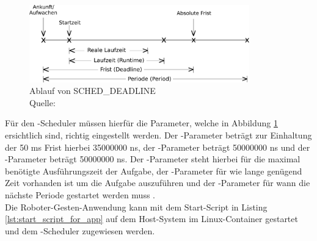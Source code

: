 \begin{figure}[htb]
	\centering
	\includegraphics[width=0.85\textwidth]{images/anhang/sched_deadline}
	\caption[Ablauf von SCHED\_DEADLINE]{Ablauf von SCHED\_DEADLINE \\Quelle: \cite{man_sched7_nodate}}
	\label{fig:sched_deadline}
\end{figure}
\FloatBarrier

Für den -Scheduler müssen hierfür die Parameter, welche in Abbildung \ref{fig:sched_deadline} ersichtlich sind, richtig eingestellt werden. Der -Parameter beträgt zur Einhaltung der 50 ms Frist hierbei 35000000 ns, der -Parameter beträgt 50000000 ns und der -Parameter beträgt 50000000 ns. Der -Parameter steht hierbei für die maximal benötigte Ausführungszeit der Aufgabe, der -Parameter für wie lange genügend Zeit vorhanden ist um die Aufgabe auszuführen und der -Parameter für wann die nächste Periode gestartet werden muss \cite{man_sched7_nodate}.\\

Die Roboter-Gesten-Anwendung kann mit dem Start-Script in Listing \ref{lst:start_script_for_app} auf dem Host-System im Linux-Container gestartet und dem -Scheduler zugewiesen werden.

